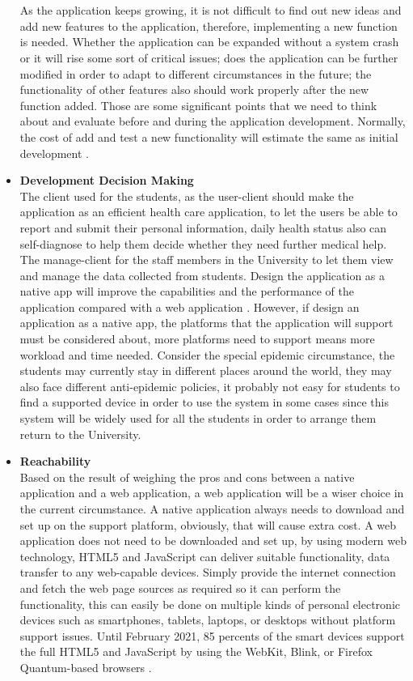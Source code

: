 \documentclass[12pt]{article}
\begin{document}
\begin{itemize}
\\
\\As the application keeps growing, it is not difficult to find out new ideas and add new features to the application, therefore, implementing a new function is needed. Whether the application can be expanded without a system crash or it will rise some sort of critical issues; does the application can be further modified in order to adapt to different circumstances in the future; the functionality of other features also should work properly after the new function added. Those are some significant points that we need to think about and evaluate before and during the application development. Normally, the cost of add and test a new functionality will estimate the same as initial development \cite{bennett2000software}.
\item\textbf{Development Decision Making}
\\The client used for the students, as the user-client should make the application as an efficient health care application, to let the users be able to report and submit their personal information, daily health status also can self-diagnose to help them decide whether they need further medical help. The manage-client for the staff members in the University to let them view and manage the data collected from students. Design the application as a native app will improve the capabilities and the performance of the application compared with a web application \cite{charland2011mobile}. However, if design an application as a native app, the platforms that the application will support must be considered about, more platforms need to support means more workload and time needed. Consider the special epidemic circumstance, the students may currently stay in different places around the world, they may also face different anti-epidemic policies, it probably not easy for students to find a supported device in order to use the system in some cases since this system will be widely used for all the students in order to arrange them return to the University. 
\item\textbf{Reachability}
\\Based on the result of weighing the pros and cons between a native application and a web application, a web application will be a wiser choice in the current circumstance. A native application always needs to download and set up on the support platform, obviously, that will cause extra cost. A web application does not need to be downloaded and set up, by using modern web technology, HTML5 and JavaScript can deliver suitable functionality, data transfer to any web-capable devices. Simply provide the internet connection and fetch the web page sources as required so it can perform the functionality, this can easily be done on multiple kinds of personal electronic devices such as smartphones, tablets, laptops, or desktops without platform support issues. Until February 2021, 85 percents of the smart devices support the full HTML5 and JavaScript by using the WebKit, Blink, or Firefox Quantum-based browsers \cite{statcounter2021}.

\end{itemize}
\end{document}
